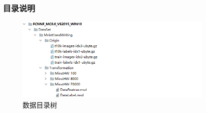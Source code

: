 \documentclass[UTF-8]{progbookcn}
\begin{document}
\subsubsection{目录说明}
\begin{figure}[!h]
  \centering
  \includegraphics[width=0.86\textwidth]{DocumentTree.png}
  \caption{数据目录树}\label{fg:MinstHWDataTree}
\end{figure}
\end{document}
